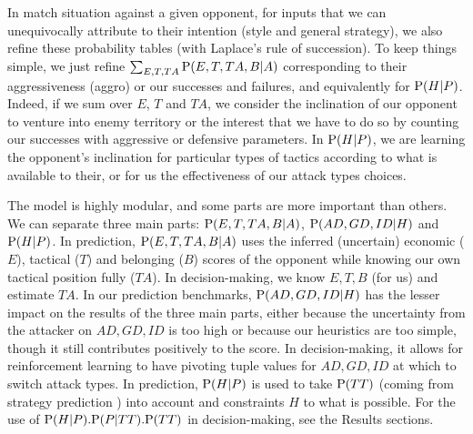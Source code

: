 In match situation against a given opponent, for inputs that we can unequivocally attribute to their intention (style and general strategy), we also refine these probability tables (with Laplace's rule of succession). To keep things simple, we just refine $\sum_{E,T,TA}\mathrm{P}(E,T,TA,B|A)$ corresponding to their aggressiveness (aggro) or our successes and failures, and equivalently for $\mathrm{P}(H|P)$. Indeed, if we sum over $E$, $T$ and $TA$, we consider the inclination of our opponent to venture into enemy territory or the interest that we have to do so by counting our successes with aggressive or defensive parameters. In $\mathrm{P}(H|P)$, we are learning the opponent's inclination for particular types of tactics according to what is available to their, or for us the effectiveness of our attack types choices.

The model is highly modular, and some parts are more important than others. We can separate three main parts: $\mathrm{P}(E,T,TA,B|A)$, $\mathrm{P}(AD,GD,ID|H)$ and $\mathrm{P}(H|P)$. In prediction, $\mathrm{P}(E,T,TA,B|A)$ uses the inferred (uncertain) economic ($E$), tactical ($T$) and belonging ($B$) scores of the opponent while knowing our own tactical position fully ($TA$). In decision-making, we know $E,T,B$ (for us) and estimate $TA$. In our prediction benchmarks, $\mathrm{P}(AD,GD,ID|H)$ has the lesser impact on the results of the three main parts, either because the uncertainty from the attacker on $AD,GD,ID$ is too high or because our heuristics are too simple, though it still contributes positively to the score. In decision-making, it allows for reinforcement learning to have pivoting tuple values for $AD,GD,ID$ at which to switch attack types. In prediction, $\mathrm{P}(H|P)$ is used to take $\mathrm{P}(TT)$ (coming from strategy prediction \cite{SYNNAEVE:StratPred}) into account and constraints $H$ to what is possible. For the use of $\mathrm{P}(H|P).\mathrm{P}(P|TT).\mathrm{P}(TT)$ in decision-making, see the Results sections.

